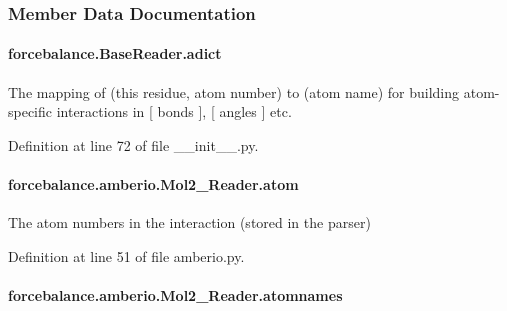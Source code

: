 \subsubsection{Member Data Documentation}
\hypertarget{classforcebalance_1_1BaseReader_a2c46ad6b66cf09a30e917ce4a1997e2a}{
\paragraph[{adict}]{\setlength{\rightskip}{0pt plus 5cm}forcebalance.\-Base\-Reader.\-adict\hspace{0.3cm}{\ttfamily [inherited]}}}\label{classforcebalance_1_1BaseReader_a2c46ad6b66cf09a30e917ce4a1997e2a}


The mapping of (this residue, atom number) to (atom name) for building atom-\/specific interactions in \mbox{[} bonds \mbox{]}, \mbox{[} angles \mbox{]} etc. 



Definition at line 72 of file \-\_\-\-\_\-init\-\_\-\-\_\-.\-py.

\hypertarget{classforcebalance_1_1amberio_1_1Mol2__Reader_a03d9efc9a25c339fe2dcd83aca20fde8}{
\paragraph[{atom}]{\setlength{\rightskip}{0pt plus 5cm}forcebalance.\-amberio.\-Mol2\-\_\-\-Reader.\-atom}}\label{classforcebalance_1_1amberio_1_1Mol2__Reader_a03d9efc9a25c339fe2dcd83aca20fde8}


The atom numbers in the interaction (stored in the parser) 



Definition at line 51 of file amberio.\-py.

\hypertarget{classforcebalance_1_1amberio_1_1Mol2__Reader_a8ac078ee1a9b7a7d8837d5822564376a}{
\paragraph[{atomnames}]{\setlength{\rightskip}{0pt plus 5cm}forcebalance.\-amberio.\-Mol2\-\_\-\-Reader.\-atomnames}}\label{classforcebalance_1_1amberio_1_1Mol2__Reader_a8ac078ee1a9b7a7d8837d5822564376a}


